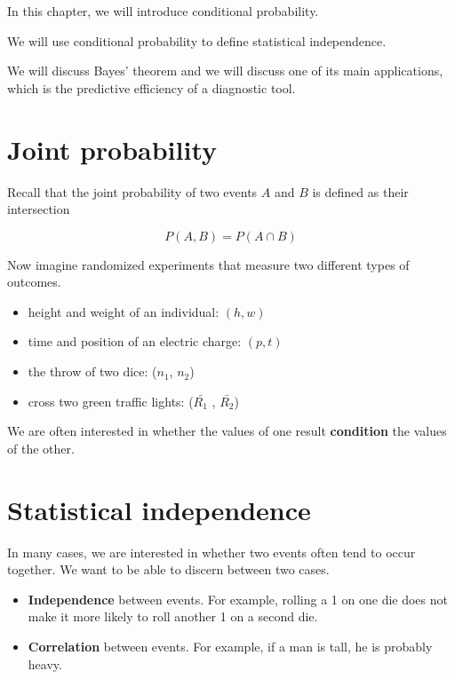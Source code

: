 \documentclass[
]{book}
\begin{document}
In this chapter, we will introduce conditional probability.

We will use conditional probability to define statistical independence.

We will discuss Bayes' theorem and we will discuss one of its main applications, which is the predictive efficiency of a diagnostic tool.

\hypertarget{joint-probability}{%
\section{Joint probability}\label{joint-probability}}

Recall that the joint probability of two events \(A\) and \(B\) is defined as their intersection

\[P( A ,B )=P(A \cap B)\]

Now imagine randomized experiments that measure two different types of outcomes.

\begin{itemize}
\item
  height and weight of an individual: \((h, w)\)
\item
  time and position of an electric charge: \((p, t)\)
\item
  the throw of two dice: (\(n_1\), \(n_2\))
\item
  cross two green traffic lights: (\(\bar{ R_ 1}\) , \(\bar{R_2}\))
\end{itemize}

We are often interested in whether the values of one result \textbf{condition} the values of the other.

\hypertarget{statistical-independence}{%
\section{Statistical independence}\label{statistical-independence}}

In many cases, we are interested in whether two events often tend to occur together. We want to be able to discern between two cases.

\begin{itemize}
\item
  \textbf{Independence} between events. For example, rolling a 1 on one die does not make it more likely to roll another 1 on a second die.
\item
  \textbf{Correlation} between events. For example, if a man is tall, he is probably heavy.
\end{itemize}
\end{document}
